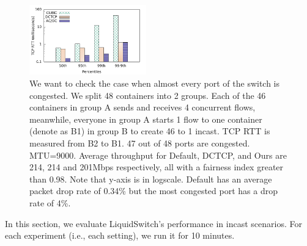 \begin{figure}[t]
        \centering
  \includegraphics[width=0.45\textwidth]{figures/incast/pressure/incast_pressure_compare_sockperf.pdf}
        \caption{We want to check the case when almost every port of the switch is congested.
		We split 48 containers into 2 groups. 
		Each of the 46 containers in group A sends and receives 4 concurrent flows, 
		meanwhile, everyone in group A starts 1 flow to one container (denote as B1) 
		in group B to create 46 to 1 incast. TCP RTT is measured from B2 to B1.
		47 out of 48 ports are congested. MTU=9000. Average throughput for Default, 
		DCTCP, and Ours are 214, 214 and 201Mbps respectively, all with a fairness
		index greater than 0.98. Note that y-axis is in logscale. Default has an average 
		packet drop rate of 0.34\% but the most congested port has a drop rate of 4\%.}
        \label{sockperf_pressure_incast}
\end{figure}


In this section, we evaluate LiquidSwitch's performance in incast scenarios. 
For each experiment (i.e., each setting), we run it for 10 minutes.

